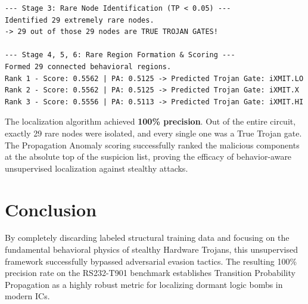 \documentclass[11pt,a4paper]{article}
\begin{document}
\begin{verbatim}
--- Stage 3: Rare Node Identification (TP < 0.05) ---
Identified 29 extremely rare nodes.
-> 29 out of those 29 nodes are TRUE TROJAN GATES!

--- Stage 4, 5, 6: Rare Region Formation & Scoring ---
Formed 29 connected behavioral regions.
Rank 1 - Score: 0.5562 | PA: 0.5125 -> Predicted Trojan Gate: iXMIT.LO
Rank 2 - Score: 0.5562 | PA: 0.5125 -> Predicted Trojan Gate: iXMIT.X
Rank 3 - Score: 0.5556 | PA: 0.5113 -> Predicted Trojan Gate: iXMIT.HI
\end{verbatim}

The localization algorithm achieved \textbf{100\% precision}. Out of the entire circuit, exactly 29 rare nodes were isolated, and every single one was a True Trojan gate. The Propagation Anomaly scoring successfully ranked the malicious components at the absolute top of the suspicion list, proving the efficacy of behavior-aware unsupervised localization against stealthy attacks.

\section{Conclusion}
By completely discarding labeled structural training data and focusing on the fundamental behavioral physics of stealthy Hardware Trojans, this unsupervised framework successfully bypassed adversarial evasion tactics. The resulting 100\% precision rate on the RS232-T901 benchmark establishes Transition Probability Propagation as a highly robust metric for localizing dormant logic bombs in modern ICs.
\end{document}

